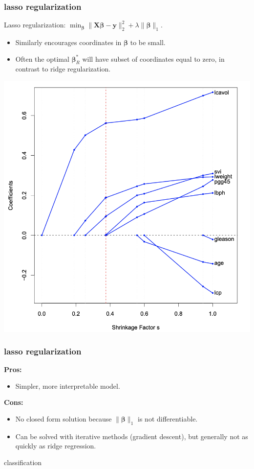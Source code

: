 \documentclass[handout,compress]{beamer}
\newcommand{\bs}[1]{\boldsymbol{#1}}
\newcommand{\bv}[1]{\mathbf{#1}}
\begin{document}
\begin{frame}
	\frametitle{lasso regularization}
		\begin{center}
		Lasso regularization: $\min_{\bs{\beta}} \|\bv{X}\bs{\beta} - \bv{y}\|_2^2 + \lambda \|\bs{\beta}\|_1$.
	\end{center}
	\begin{itemize}
		\item Similarly encourages coordinates in $\bs{\beta}$ to be small. 
		\item Often the optimal $\bs{\beta}_R^*$ will have subset of coordinates equal to zero, in contrast to ridge regularization.
	\end{itemize}
	\vspace{-1em}
	\begin{center}
		\includegraphics[width=.4\textwidth]{lasso_coeffs.png}
	\end{center}
\end{frame}

\begin{frame}
	\frametitle{lasso regularization}
	\textbf{Pros:}
	\begin{itemize}
		\item Simpler, more interpretable model.
	\end{itemize}

	\textbf{Cons:}
\begin{itemize}
	\item No closed form solution because $\|\bs{\beta}\|_1$ is not differentiable. 
	\item Can be solved with iterative methods (gradient descent), but generally not as quickly as ridge regression.
\end{itemize}
	
\end{frame}

\begin{frame}[standout]
	\begin{center}
		\large classification
	\end{center}
\end{frame}
\end{document}
